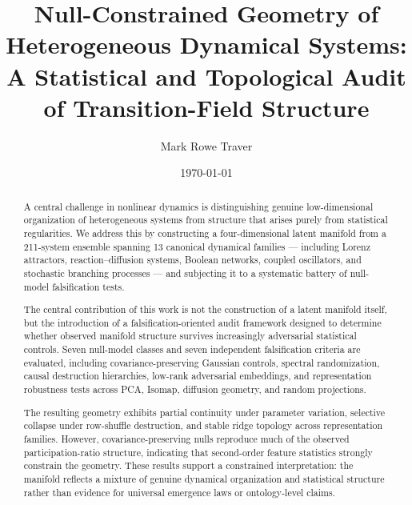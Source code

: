\documentclass[%
 aip,
 chaos,
 amsmath,amssymb,
 reprint,
]{revtex4-2}
\begin{document}
\title{Null-Constrained Geometry of Heterogeneous Dynamical Systems: A Statistical and Topological Audit of Transition-Field Structure}

\author{Mark Rowe Traver}

\date{\today}

\begin{abstract}
A central challenge in nonlinear dynamics is distinguishing genuine low-dimensional organization of heterogeneous systems from structure that arises purely from statistical regularities. We address this by constructing a four-dimensional latent manifold from a 211-system ensemble spanning 13 canonical dynamical families --- including Lorenz attractors, reaction--diffusion systems, Boolean networks, coupled oscillators, and stochastic branching processes --- and subjecting it to a systematic battery of null-model falsification tests. 

The central contribution of this work is not the construction of a latent manifold itself, but the introduction of a falsification-oriented audit framework designed to determine whether observed manifold structure survives increasingly adversarial statistical controls. Seven null-model classes and seven independent falsification criteria are evaluated, including covariance-preserving Gaussian controls, spectral randomization, causal destruction hierarchies, low-rank adversarial embeddings, and representation robustness tests across PCA, Isomap, diffusion geometry, and random projections.

The resulting geometry exhibits partial continuity under parameter variation, selective collapse under row-shuffle destruction, and stable ridge topology across representation families. However, covariance-preserving nulls reproduce much of the observed participation-ratio structure, indicating that second-order feature statistics strongly constrain the geometry. These results support a constrained interpretation: the manifold reflects a mixture of genuine dynamical organization and statistical structure rather than evidence for universal emergence laws or ontology-level claims.
\end{abstract}

\maketitle
\end{document}
